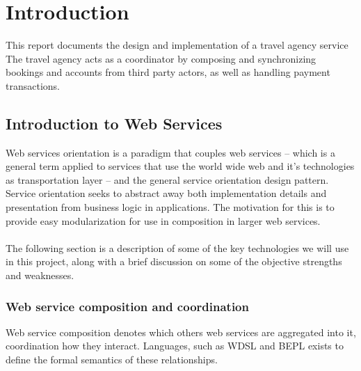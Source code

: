 \chapter{Introduction}
This report documents the design and implementation of a travel agency service The travel agency acts as a coordinator by composing and synchronizing bookings and accounts from third party actors, as well as handling payment transactions.

\section{Introduction to Web Services}


Web services orientation is a paradigm that couples web services -- which is a general term applied to services that use the world wide web and it's technologies as transportation layer -- and the general service orientation design pattern. Service orientation seeks to abstract away both implementation details and presentation from business logic in applications. The motivation for this is to provide easy modularization for use in composition in larger web services.\\\\
The following section is a description of some of the key technologies we will use in this project, along with a brief discussion on some of the objective strengths and weaknesses.


\subsection{Web service composition and coordination}
Web service composition denotes which others web services are aggregated into it, coordination how they interact. Languages, such as WDSL and BEPL exists to define the formal semantics of these relationships.

